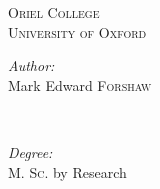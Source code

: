 \documentclass[12pt,a4paper]{report}
\begin{document}
\begin{titlepage}
	\textsc{\large Oriel College}\\[0.5cm] %
	\textsc{\LARGE University of Oxford}\\[1.5cm] %
	
	
	
	\begin{minipage}{0.45\textwidth}
		\begin{flushleft} \large
			\emph{Author:}\\
			Mark Edward  \textsc{Forshaw} %
		\end{flushleft}
	\end{minipage}
	~
	\begin{minipage}{0.45\textwidth}
		\begin{flushright} \large
			\emph{Degree:} \\
			 \textsc{M. Sc.} by Research 
		\end{flushright}
	\end{minipage}\\[4cm]
	
	
	
	
	
	\vfill %
	
\end{titlepage}
\end{document}
